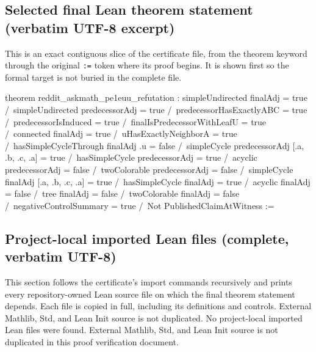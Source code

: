 \documentclass[11pt]{article}
\begin{document}
\subsection*{Selected final Lean theorem statement (verbatim UTF-8 excerpt)}
This is an exact contiguous slice of the certificate file, from the theorem keyword through the original \texttt{:=} token where its proof begins. It is shown first so the formal target is not buried in the complete file.
\begin{Vlean}
theorem reddit_askmath_pe1euu_refutation :
    simpleUndirected finalAdj = true /\
    simpleUndirected predecessorAdj = true /\
    predecessorHasExactlyABC = true /\
    predecessorIsInduced = true /\
    finalIsPredecessorWithLeafU = true /\
    connected finalAdj = true /\
    uHasExactlyNeighborA = true /\
    hasSimpleCycleThrough finalAdj .u = false /\
    simpleCycle predecessorAdj [.a, .b, .c, .a] = true /\
    hasSimpleCycle predecessorAdj = true /\
    acyclic predecessorAdj = false /\
    twoColorable predecessorAdj = false /\
    simpleCycle finalAdj [.a, .b, .c, .a] = true /\
    hasSimpleCycle finalAdj = true /\
    acyclic finalAdj = false /\
    tree finalAdj = false /\
    twoColorable finalAdj = false /\
    negativeControlSummary = true /\
    Not PublishedClaimAtWitness :=
\end{Vlean}
\subsection*{Project-local imported Lean files (complete, verbatim UTF-8)}
This section follows the certificate's import commands recursively and prints every repository-owned Lean source file on which the final theorem statement depends. Each file is copied in full, including its definitions and controls. External Mathlib, Std, and Lean Init source is not duplicated.
No project-local imported Lean files were found. External Mathlib, Std, and Lean Init source is not duplicated in this proof verification document.
\end{document}
